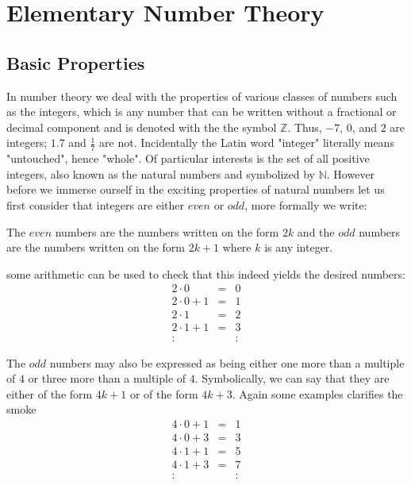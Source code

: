 \chapter{Elementary Number Theory}

\section{Basic Properties}
In number theory we deal with the properties of various classes of numbers such as the integers, which is any number that can be written without a fractional or decimal component and is denoted with the the symbol $\mathbb{Z}$. Thus, $-7$, $0$, and $2$ are integers; $1.7$ and $\frac{1}{7}$ are not. Incidentally the Latin word "integer" literally means "untouched", hence "whole". Of particular interests is the set of all positive integers, also known as the natural numbers and symbolized by $\mathbb{N}$. However before we immerse ourself in the exciting properties of natural numbers let us first consider that integers are either $even$ or $odd$, more formally we write: 
\begin{defi}\label{num_def}
The $even$ numbers are the numbers written on the form $2k$ and the $odd$ numbers are the numbers written on the form $2k+1$ where $k$ is any integer.
\end{defi}
some arithmetic can be used to check that this indeed yields the desired numbers:
\[\begin{array}{lcl} 
2 \cdot 0     & = & 0 \\
2 \cdot 0 + 1 & = & 1 \\
2 \cdot 1     & = & 2 \\
2 \cdot 1 + 1 & = & 3 \\
:             &   & :
\end{array}\]

The $odd$ numbers may also be expressed as being either one more than a multiple of $4$ or three more than a multiple of $4$. Symbolically, we can say that they are either of the form $4k + 1$ or of the form $4k  + 3$. Again some examples clarifies the smoke
\[\begin{array}{lcl} 
4 \cdot 0 + 1 & = & 1 \\
4 \cdot 0 + 3 & = & 3 \\
4 \cdot 1 + 1 & = & 5 \\
4 \cdot 1 + 3 & = & 7 \\
:             &   & :
\end{array}\]

